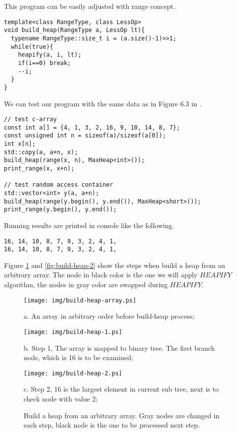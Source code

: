 \documentclass{article}
\begin{document}
This program can be easily adjusted with range concept.

\begin{lstlisting}
template<class RangeType, class LessOp>
void build_heap(RangeType a, LessOp lt){
  typename RangeType::size_t i = (a.size()-1)>>1;
  while(true){
    heapify(a, i, lt);
    if(i==0) break;
    --i;
  }
}
\end{lstlisting}

We can test our program with the same data as in Figure 6.3 in \cite{CLRS}.

\begin{lstlisting}
// test c-array
const int a[] = {4, 1, 3, 2, 16, 9, 10, 14, 8, 7};
const unsigned int n = sizeof(a)/sizeof(a[0]);
int x[n];
std::copy(a, a+n, x);
build_heap(range(x, n), MaxHeap<int>());
print_range(x, x+n);

// test random access container
std::vector<int> y(a, a+n);
build_heap(range(y.begin(), y.end()), MaxHeap<short>());
print_range(y.begin(), y.end());
\end{lstlisting}

Running results are printed in console like the following.

\begin{verbatim}
16, 14, 10, 8, 7, 9, 3, 2, 4, 1, 
16, 14, 10, 8, 7, 9, 3, 2, 4, 1,
\end{verbatim}

Figure \ref{fig:build-heap-1} and \ref{fig:build-heap-2} 
show the steps when build a heap from
an arbitrary array. The node in black color is the one we will apply
$HEAPIFY$ algorithm, the nodes in gray color are swapped during
$HEAPIFY$.

\begin{figure}[htbp]
  \begin{center}
    \texttt{[image: img/build-heap-array.ps]}

    a. An array in arbitrary order before build-heap process;

    \texttt{[image: img/build-heap-1.ps]}

    b. Step 1, The array is mapped to binary tree. The first branch node, which is
16 is to be examined;

    \texttt{[image: img/build-heap-2.ps]}

    c. Step 2, 16 is the largest element in current sub tree, next is to check node
with value 2;
    
    \caption{Build a heap from an arbitrary array. Gray nodes are changed in each step,
black node is the one to be processed next step.} \label{fig:build-heap-1}
  \end{center}
\end{figure}
\end{document}
